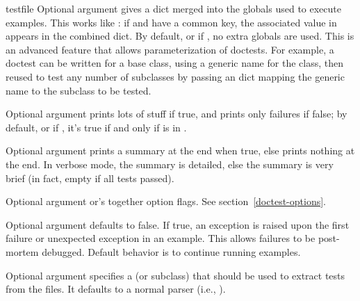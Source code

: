 \begin{funcdesc}{testfile}
  Optional argument  gives a dict merged into the
  globals used to execute examples.  This works like
  :  if  and  have a
  common key, the associated value in  appears in the
  combined dict.  By default, or if , no extra globals are
  used.  This is an advanced feature that allows parameterization of
  doctests.  For example, a doctest can be written for a base class, using
  a generic name for the class, then reused to test any number of
  subclasses by passing an  dict mapping the generic
  name to the subclass to be tested.

  Optional argument  prints lots of stuff if true, and prints
  only failures if false; by default, or if , it's true
  if and only if  is in .

  Optional argument  prints a summary at the end when true,
  else prints nothing at the end.  In verbose mode, the summary is
  detailed, else the summary is very brief (in fact, empty if all tests
  passed).

  Optional argument  or's together option flags.  See
  section~\ref{doctest-options}.

  Optional argument  defaults to false.  If true,
  an exception is raised upon the first failure or unexpected exception
  in an example.  This allows failures to be post-mortem debugged.
  Default behavior is to continue running examples.

  Optional argument  specifies a  (or
  subclass) that should be used to extract tests from the files.  It
  defaults to a normal parser (i.e., ).

\end{funcdesc}

